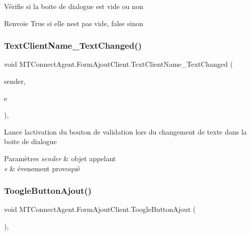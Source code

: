 Vérifie si la boite de dialogue est vide ou non 

\begin{DoxyReturn}{Renvoie}
True si elle n\textquotesingle{}est pas vide, false sinon
\end{DoxyReturn}
\mbox{\label{class_m_t_connect_agent_1_1_form_ajout_client_a0cf04c36ae8e2bc9c5d06d1fb72ad9a0}} 
\subsubsection{\texorpdfstring{Text\+Client\+Name\+\_\+\+Text\+Changed()}{TextClientName\_TextChanged()}}
{\footnotesize\ttfamily void M\+T\+Connect\+Agent.\+Form\+Ajout\+Client.\+Text\+Client\+Name\+\_\+\+Text\+Changed (\begin{DoxyParamCaption}\item[{object}]{sender,  }\item[{Event\+Args}]{e }\end{DoxyParamCaption})\hspace{0.3cm}{\ttfamily [inline]}, {\ttfamily [private]}}



Lance l\textquotesingle{}activation du bouton de validation lors du changement de texte dans la boite de dialogue 


\begin{DoxyParams}{Paramètres}
{\em sender} & objet appelant\\
\hline
{\em e} & évenement provoqué\\
\hline
\end{DoxyParams}
\mbox{\label{class_m_t_connect_agent_1_1_form_ajout_client_a7d4e9cad9fdcac1e9109661794bf4c38}} 
\subsubsection{\texorpdfstring{Toogle\+Button\+Ajout()}{ToogleButtonAjout()}}
{\footnotesize\ttfamily void M\+T\+Connect\+Agent.\+Form\+Ajout\+Client.\+Toogle\+Button\+Ajout (\begin{DoxyParamCaption}{ }\end{DoxyParamCaption})\hspace{0.3cm}{\ttfamily [inline]}, {\ttfamily [private]}}



